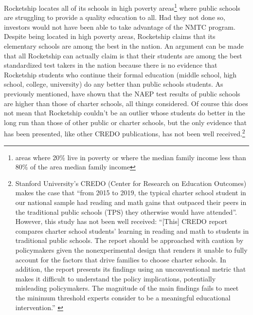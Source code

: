 Rocketship locates all of its schools in high poverty areas\footnote{areas where 20\% live in poverty or where the median family income less than 80\% of the area median family income\parencite[13-14]{CDFI2020}} where public schools are struggling to provide a quality education to all. Had they not done so, investors would not have been able to take advantage of the NMTC program. Despite being located in high poverty areas, Rocketship claims that its elementary schools are among the best in the nation\parencite{Abousalem2021}. An argument can be made that all Rocketship can actually claim is that their students are among the best standardized test takers in the nation because there is no evidence that Rocketship students who continue their formal education (middle school, high school, college, university) do any better than public schools students. As previously mentioned, \textcite{Lubienski.Lubienski2014} have shown that the NAEP test results of public schools are higher than those of charter schools, all things considered. Of course this does not mean that Rocketship couldn't be an outlier whose students do better in the long run than those of other public or charter schools, but the only evidence that has been presented\parencite{Raymond.etal2023}, like other CREDO publications, has not been well received.\footnote{Stanford University's CREDO (Center for Research on Education Outcomes) makes the case that ``from 2015 to 2019, the typical charter school student in our national sample had reading and math gains that outpaced their peers in the traditional public schools (TPS) they otherwise would have attended''. However, this study has not been well received: ``[This] CREDO report compares charter school students’ learning in reading and math to students in traditional public schools. The report should be approached with caution by policymakers given the nonexperimental design that renders it unable to fully account for the factors that drive families to choose charter schools. In addition, the report presents its findings using an unconventional metric that makes it difficult to understand the policy implications, potentially misleading policymakers. The magnitude of the main findings fails to meet the minimum threshold experts consider to be a meaningful educational intervention.'' \parencite{Ferrare2023}}

